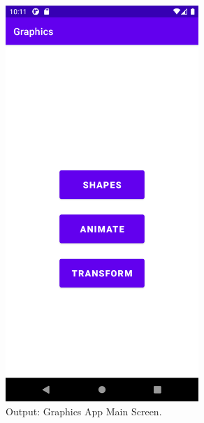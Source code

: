 \documentclass[12pt, a4]{article}
\begin{document}
\newpage
\subsection*{}
\begin{flushleft}

\end{flushleft}

\newpage
\subsection*{}
\begin{flushleft}

\end{flushleft}

\newpage
\subsection*{}
\begin{flushleft}

\end{flushleft}


\newpage
\subsection*{}
\begin{figure}[h]
\centering
\caption{Output: Graphics App Main Screen.}
\includegraphics[height=15cm, width=7.3cm]{Graphics/Screenshots/Graphics-1.png}
\end{figure}
\end{document}
